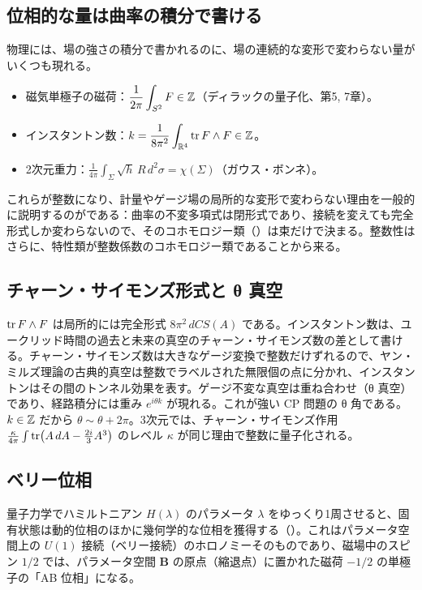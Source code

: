 \subsection*{位相的な量は曲率の積分で書ける}
物理には、場の強さの積分で書かれるのに、場の連続的な変形で変わらない量がいくつも現れる。
\begin{itemize}
\item 磁気単極子の磁荷：$\displaystyle\frac{1}{2\pi}\int_{S^2}F\in\mathbb{Z}$（ディラックの量子化、第5, 7章）。
\item インスタントン数：$\displaystyle k=\frac{1}{8\pi^2}\int_{\mathbb{R}^4}\tr F\wedge F\in\mathbb{Z}$。
\item 2次元重力：$\displaystyle\frac{1}{4\pi}\int_\Sigma\sqrt h\,R\,d^2\sigma=\chi(\Sigma)$（ガウス・ボンネ）。
\end{itemize}
これらが整数になり、計量やゲージ場の局所的な変形で変わらない理由を一般的に説明するのがである：曲率の不変多項式は閉形式であり、接続を変えても完全形式しか変わらないので、そのコホモロジー類（）は束だけで決まる。整数性はさらに、特性類が整数係数のコホモロジー類であることから来る。

\subsection*{チャーン・サイモンズ形式と θ 真空}
$\tr F\wedge F$ は局所的には完全形式 $8\pi^2\,dCS(A)$ である。インスタントン数は、ユークリッド時間の過去と未来の真空のチャーン・サイモンズ数の差として書ける。チャーン・サイモンズ数は大きなゲージ変換で整数だけずれるので、ヤン・ミルズ理論の古典的真空は整数でラベルされた無限個の点に分かれ、インスタントンはその間のトンネル効果を表す。ゲージ不変な真空は重ね合わせ（θ 真空）であり、経路積分には重み $e^{i\theta k}$ が現れる。これが強い CP 問題の θ 角である。$k\in\mathbb{Z}$ だから $\theta\sim\theta+2\pi$。3次元では、チャーン・サイモンズ作用 $\tfrac{\kappa}{4\pi}\int\tr(A\,dA-\tfrac{2i}{3}A^3)$ のレベル $\kappa$ が同じ理由で整数に量子化される。

\subsection*{ベリー位相}
量子力学でハミルトニアン $H(\lambda)$ のパラメータ $\lambda$ をゆっくり1周させると、固有状態は動的位相のほかに幾何学的な位相を獲得する（）。これはパラメータ空間上の $U(1)$ 接続（ベリー接続）のホロノミーそのものであり、磁場中のスピン $1/2$ では、パラメータ空間 $\bm B$ の原点（縮退点）に置かれた磁荷 $-1/2$ の単極子の「AB 位相」になる。

